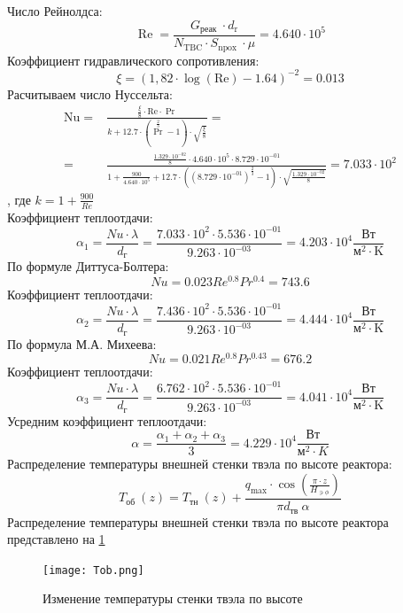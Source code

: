 Число Рейнолдса:
$$
\operatorname{Re}=\frac{G_{\text {реак }} \cdot d_{\mathrm{r}}}{N_{\mathrm{TBC}} \cdot S_{\text {npox }} \cdot \mu} = 4.640 \cdot 10^{ 5 }
$$
Коэффициент гидравлического сопротивления:
$$
\xi=(1,82 \cdot \log (\mathrm{Re})-1.64)^{-2}= 0.013
$$
Расчитываем число Нуссельта:
\begin{align*}
\mathrm{Nu}=&\frac{\frac{\xi}{8} \cdot \mathrm{Re} \cdot \operatorname{Pr}}{k+12.7 \cdot\left(\operatorname{Pr}^{\frac{2}{3}}-1\right) \cdot \sqrt{\frac{\xi}{8}}}
=\\=&
\frac{ 
    \frac{1.329 \cdot 10^{ -02 }}{8} \cdot 4.640 \cdot 10^{ 5 } \cdot 8.729 \cdot 10^{ -01 } 
}
{ 
    1 + \frac{900}{4.640 \cdot 10^{ 5 }} + 12.7 \cdot\left((8.729 \cdot 10^{ -01 })^{\frac{2}{3}}-1\right) \cdot \sqrt{\frac{1.329 \cdot 10^{ -02 }}{8}} 
} = 7.033 \cdot 10^{ 2 } 
\end{align*}, где $k = 1 + \frac{900}{Re}$  \\
Коэффициент теплоотдачи:
    $$
    \alpha_1 = \frac {Nu \cdot \lambda} {d_\text{г}} = \frac {7.033 \cdot 10^{ 2 } \cdot 5.536 \cdot 10^{ -01 }}{9.263 \cdot 10^{ -03 }} = 4.203 \cdot 10^{ 4 } \frac {\text{Вт}}{\text{м}^2\cdot\mathrm{K}}
    $$
По формуле Диттуса-Болтера:
    $$
    Nu = 0.023Re^{0.8}Pr^{0.4} = 743.6
    $$
Коэффициент теплоотдачи:
    $$
    \alpha_2 = \frac {Nu \cdot \lambda} {d_\text{г}} = \frac {7.436 \cdot 10^{ 2 } \cdot 5.536 \cdot 10^{ -01 }}{9.263 \cdot 10^{ -03 }} = 4.444 \cdot 10^{ 4 } \frac {\text{Вт}}{\text{м}^2\cdot\mathrm{K}}
    $$
По формула М.А. Михеева:
    $$
    Nu = 0.021Re^{0.8}Pr^{0.43} = 676.2
    $$
Коэффициент теплоотдачи:
    $$
    \alpha_3 = \frac {Nu \cdot \lambda} {d_\text{г}} = \frac {6.762 \cdot 10^{ 2 } \cdot 5.536 \cdot 10^{ -01 }}{9.263 \cdot 10^{ -03 }} = 4.041 \cdot 10^{ 4 } \frac {\text{Вт}}{\text{м}^2\cdot\mathrm{K}}
    $$
Усредним коэффициент теплоотдачи:
    $$
    \alpha = \frac {\alpha_1 + \alpha_2 + \alpha_3} {3} = 4.229 \cdot 10^{ 4 } \frac{\text{Вт}}{\text{м}^2 \cdot K}
    $$
Распределение температуры внешней стенки твэла по высоте реактора:
    $$
    T_{\text {об }}(z)=T_{\text {тн }}(z)+\frac{q_{\max } \cdot \cos \left(\frac{\pi \cdot z}{H_{\ni \phi}}\right)}{\pi d_{\text {тв }} \alpha}
    $$
Распределение температуры внешней стенки
твэла по высоте реактора представлено на \ref{pic:Tob}

\begin{figure}[H]
	\begin{center}
		\texttt{[image: Tob.png]}
		\caption{Изменение температуры стенки твэла по высоте}
		\label{pic:Tob} %
	\end{center}
\end{figure}


